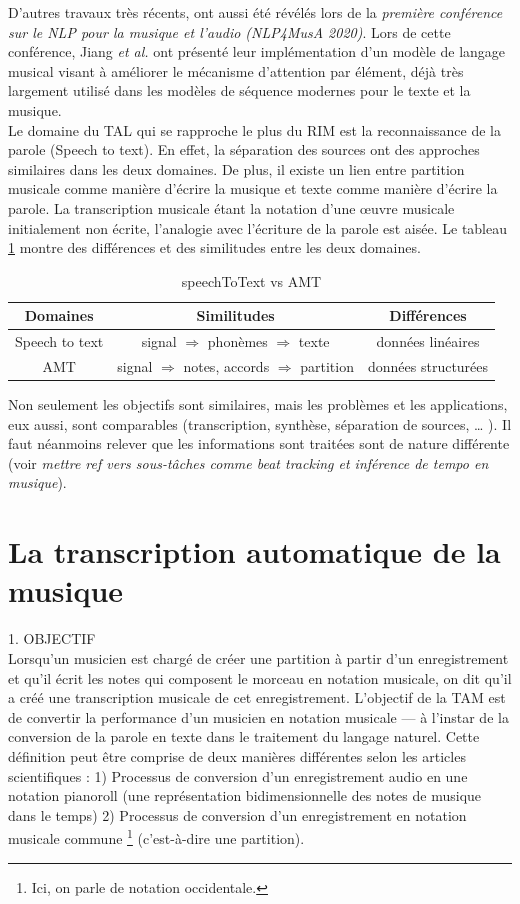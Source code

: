 D’autres travaux
très récents, ont aussi été révélés lors de la \textit{première conférence sur
le NLP pour la musique et l’audio (NLP4MusA 2020)}. Lors de cette conférence,
Jiang \textit{et al.} \cite{Jiang2020DiscoveringMR} ont présenté leur
implémentation d’un modèle de langage musical visant à améliorer le mécanisme
d’attention par élément, déjà très largement utilisé dans les modèles de
séquence modernes pour le texte et la musique.\\
Le domaine du TAL qui se rapproche le plus du RIM est la reconnaissance de la
parole (Speech to text). En effet, la séparation des sources ont des approches
similaires dans les deux domaines. De plus, il existe un lien entre partition
musicale comme manière d’écrire la musique et texte comme manière d’écrire la
parole. La transcription musicale étant la notation d’une œuvre musicale
initialement non écrite, l’analogie avec l’écriture de la parole est aisée. Le
tableau \ref{spToTxt_vs_TAM} montre des différences et des similitudes entre
les deux domaines.

\begin{table}[h]
	\centering
	\begin{tabular}{|c|c|c|} \hline
	Domaines & Similitudes & Différences \\ \hline
	Speech to text & signal $\Rightarrow$ phonèmes $\Rightarrow$
    texte & données linéaires\\
	AMT & signal $\Rightarrow$ notes, accords $\Rightarrow$ partition & données
    structurées\\ \hline
	\end{tabular}
	\caption{speechToText vs AMT}
	\label{spToTxt_vs_TAM}
\end{table}
Non seulement les objectifs sont similaires, mais les problèmes et les
applications, eux aussi, sont comparables (transcription, synthèse, séparation
de sources, … ). Il faut néanmoins relever que les informations sont traitées
sont de nature différente (voir \textit{mettre ref vers sous-tâches comme beat
tracking et inférence de tempo en musique}).

\section{La transcription automatique de la musique}
1. OBJECTIF\\
Lorsqu’un musicien est chargé de créer une partition à partir d’un
enregistrement et qu’il écrit les notes qui composent le morceau en notation
musicale, on dit qu’il a créé une transcription musicale de cet enregistrement.
L’objectif de la TAM \cite{future_directions} est de convertir la performance
d’un musicien en notation musicale — à l’instar de la conversion de la parole
en texte dans le traitement du langage naturel. Cette définition peut être
comprise de deux manières différentes selon les articles scientifiques :
1) Processus de conversion d’un enregistrement audio en une notation pianoroll
(une représentation bidimensionnelle des notes de musique dans le temps)
2) Processus de conversion d’un enregistrement en notation musicale commune
\footnote{Ici, on parle de notation occidentale.} (c’est-à-dire une
partition).\\

